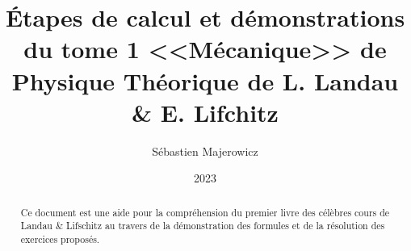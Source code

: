 \documentclass[12pt,a4paper]{memoir} %
\title{\'Etapes de calcul et d\'emonstrations du tome 1 <<M\'ecanique>>  de Physique Th\'eorique de L. Landau \&  E. Lifchitz}
\author{S\'ebastien Majerowicz}
\date{2023}
\begin{document}
\maketitle

\begin{abstract}
Ce document est une aide pour la compr\'ehension du premier livre des célèbres cours de Landau \& Lifschitz au travers de la démonstration des formules et de la résolution des exercices propos\'es.
\end{abstract}

\tableofcontents*

\clearpage
{}
\setcounter{page}{1}


\end{document}
